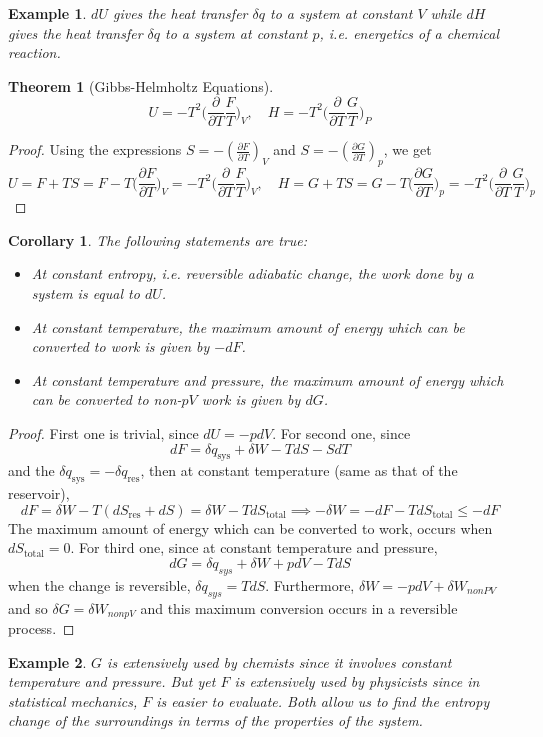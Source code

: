 \documentclass[a4paper]{article}
\newtheorem{eg}{Example}[section]
\theoremstyle{new}
\newtheorem{thm}{Theorem}[section]
\newtheorem{cor}{Corollary}[section]
\begin{document}
\begin{eg}
$dU$ gives the heat transfer $\delta q$ to a system at constant $V$ while $dH$ gives the heat transfer $\delta q$ to a system at constant $p$, i.e. energetics of a chemical reaction.
\end{eg}
\begin{thm}[Gibbs-Helmholtz Equations]
\begin{equation}
U=-T^2\bigg(\frac{\partial}{\partial T}\frac{F}{T}\bigg)_V,\quad H=-T^2\bigg(\frac{\partial}{\partial T}\frac{G}{T}\bigg)_P\label{GibbsHelmholtz}
\end{equation}
\end{thm}
\begin{proof}
Using the expressions $S=-(\frac{\partial F}{\partial T})_V$ and $S=-(\frac{\partial G}{\partial T})_p$, we get
$$U=F+TS=F-T\bigg(\frac{\partial F}{\partial T}\bigg)_V=-T^2\bigg(\frac{\partial}{\partial T}\frac{F}{T}\bigg)_V,\quad H=G+TS=G-T\bigg(\frac{\partial G}{\partial T}\bigg)_p=-T^2\bigg(\frac{\partial}{\partial T}\frac{G}{T}\bigg)_p$$
\end{proof}
\begin{cor}
The following statements are true:
\begin{itemize}
    \item At constant entropy, i.e. reversible adiabatic change, the work done by a system is equal to $dU$.
    \item At constant temperature, the maximum amount of energy which can be converted to work is given by $-dF$.
    \item At constant temperature and pressure, the maximum amount of energy which can be converted to non-$pV$ work is given by $dG$.
\end{itemize}
\end{cor}
\begin{proof}
First one is trivial, since $dU=-pdV$. For second one, since
$$dF=\delta q_{\text{sys}}+\delta W-TdS-SdT$$
and the $\delta q_{\text{sys}}=-\delta q_{\text{res}}$, then at constant temperature (same as that of the reservoir),
$$dF=\delta W-T(dS_{\text{res}}+dS)=\delta W-TdS_{\text{total}}\implies -\delta W=-dF-TdS_{\text{total}}\leq -dF$$
The maximum amount of energy which can be converted to work, occurs when $dS_{\text{total}}=0$. For third one, since at constant temperature and pressure,
$$dG=\delta q_{sys}+\delta W+pdV−TdS$$
when the change is reversible, $\delta q_{sys}=TdS$. Furthermore, $\delta W=-pdV+\delta W_{nonPV}$ and so $\delta G=\delta W_{nonpV}$ and this maximum conversion occurs in a reversible process.
\end{proof}
\begin{eg}
$G$ is extensively used by chemists since it involves constant temperature and pressure. But yet $F$ is extensively used by physicists since in statistical mechanics, $F$ is easier to evaluate. Both allow us to find the entropy change of the surroundings in terms of the properties of the system.
\end{eg}
\newpage
\end{document}
